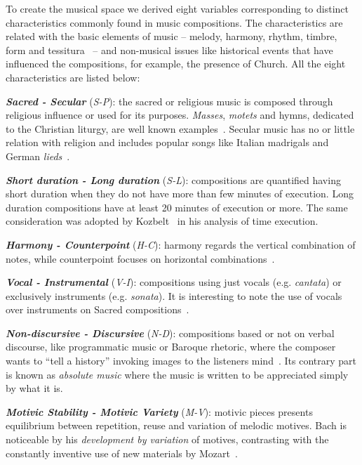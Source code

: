 \documentclass[
 aip,
 jmp,
 amsmath,amssymb,
 reprint,
]{revtex4-1}
\begin{document}
To create the musical space we derived eight variables corresponding to
distinct characteristics commonly found in music compositions. The
characteristics are related with the basic elements of music -- melody,
harmony, rhythm, timbre, form and tessitura~\cite{BennettHistory} -- and
non-musical issues like historical events that have influenced the
compositions, for example, the
presence of Church. All the eight
characteristics are listed below:

{\bf \em{ Sacred - Secular}} (\emph{S-P}): the sacred or religious music is
composed through religious influence or used for its purposes. \textit{Masses},
\textit{motets} and hymns, dedicated to the Christian liturgy, are well known examples~\cite{Lovelock}. Secular
music has no or little relation with religion and includes
popular songs like Italian madrigals and German \textit{lieds}~\cite{BennettHistory}. 

{\bf \em{ Short duration - Long duration}} (\emph{S-L}): compositions are
quantified having short duration when they do not have more than few minutes
of execution. Long duration compositions have at least 20 minutes of execution or
more. The same consideration was adopted by Kozbelt~\cite{Kozbelt01012009,
  Kozbelt01012007} in his analysis of time execution.

{\bf \em{ Harmony - Counterpoint}} (\emph{H-C}): harmony regards the
vertical combination of notes, while counterpoint focuses on
horizontal combinations~\cite{BennettHistory}.

{\bf \em{ Vocal - Instrumental}} (\emph{V-I}): compositions using just vocals
(e.g. \emph{cantata}) or exclusively instruments
(e.g. \emph{sonata}). It is interesting to note the use of
vocals over instruments on Sacred compositions~\cite{Lovelock}.

{\bf \em{ Non-discursive - Discursive}} (\emph{N-D}): compositions
based or not
on verbal discourse, like programmatic music or Baroque rhetoric, where the composer wants
to ``tell a history'' invoking images to the listeners
mind~\cite{BennettHistory}. Its contrary part is known as
\textit{absolute music} where the music is written to be appreciated simply
by what it is.

{\bf \em{ Motivic Stability - Motivic Variety}} (\emph{M-V}): motivic pieces presents equilibrium
between repetition, reuse and variation of melodic motives. Bach is noticeable by his
\textit{development by variation} of motives, contrasting with the
constantly inventive use of new materials by Mozart~\cite{Webern}.
\end{document}
